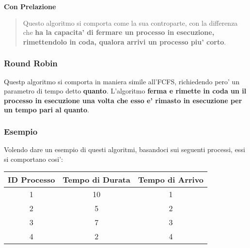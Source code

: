 \documentclass{article}
\begin{document}
{    \textbf{Con Prelazione}
    \begin{quote}
      Questo algoritmo si comporta come la sua controparte, con la differenza che \textbf{ha la capacita' di fermare un processo in esecuzione, rimettendolo in coda, qualora arrivi un processo piu' corto}.
    \end{quote}

    \subsubsection{Round Robin} %
    Questp algoritmo si comporta in maniera simile all'FCFS, richiedendo pero' un parametro di tempo detto \textbf{quanto}. L'algoritmo \textbf{ferma e rimette in coda un il processo in esecuzione una volta che esso e' rimasto in esecuzione per un tempo pari al quanto}. 

    \subsubsection{Esempio} %
    Volendo dare un esempio di questi algoritmi, basandoci sui seguenti processi, essi si comportano cosi':

    \begin{tabular}{ |c|c|c| }
      \hline
      ID Processo & Tempo di Durata & Tempo di Arrivo \\
      \hline
      1 & 10 & 1 \\
      2 & 5 & 2 \\
      3 & 7 & 3 \\
      4 & 2 & 4 \\
      \hline
    \end{tabular}

    \newcommand{\ProcessGraph}[4]{
      \addplot [
        domain=#2:#3,
        color=#4,
      ]{#1};
    }

    }
\end{document}
